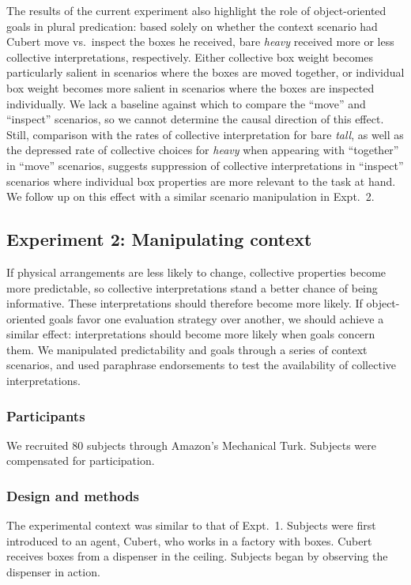 \documentclass[linguex]{sp}
\begin{document}
The results of the current experiment also highlight the role of object-oriented goals in plural predication: based solely on whether the context scenario had Cubert move vs.~inspect the boxes he received, bare \emph{heavy} received more or less collective interpretations, respectively. Either collective box weight becomes particularly salient in scenarios where the boxes are moved together, or individual box weight becomes more salient in scenarios where the boxes are inspected individually. We lack a baseline against which to compare the ``move'' and ``inspect'' scenarios, so we cannot determine the causal direction of this effect. Still, comparison with the rates of collective interpretation for bare \emph{tall}, as well as the depressed rate of collective choices for \emph{heavy} when appearing with ``together'' in ``move'' scenarios, suggests suppression of collective interpretations in ``inspect'' scenarios where individual box properties are more relevant to the task at hand. We follow up on this effect with a similar scenario manipulation in Expt.~2.


\subsection{Experiment 2: Manipulating context}

If physical arrangements are less likely to change, collective properties become more predictable, so collective interpretations stand a better chance of being informative. These interpretations should therefore become more likely. If object-oriented goals favor one evaluation strategy over another, we should achieve a similar effect: interpretations should become more likely when goals concern them. We manipulated predictability and goals through a series of context scenarios, and used paraphrase endorsements to test the availability of collective interpretations.

\subsubsection{Participants}

We recruited 80 subjects through Amazon's Mechanical Turk. Subjects were compensated for participation.

\subsubsection{Design and methods}

The experimental context was similar to that of Expt.~1. Subjects were first introduced to an agent, Cubert, who works in a factory with boxes. Cubert receives boxes from a dispenser in the ceiling. Subjects began by observing the dispenser in action.
\end{document}
